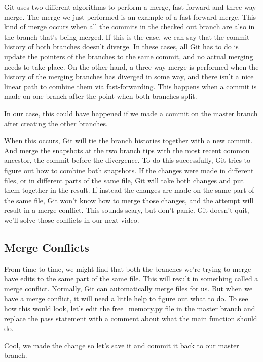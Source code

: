 	Git uses two different algorithms to perform a merge, fast-forward and three-way merge. The merge we just performed is an example of a fast-forward merge. This kind of merge occurs when all the commits in the checked out branch are also in the branch that's being merged. If this is the case, we can say that the commit history of both branches doesn't diverge. In these cases, all Git has to do is update the pointers of the branches to the same commit, and no actual merging needs to take place. On the other hand, a three-way merge is performed when the history of the merging branches has diverged in some way, and there isn't a nice linear path to combine them via fast-forwarding. This happens when a commit is made on one branch after the point when both branches split.
	
	In our case, this could have happened if we made a commit on the master branch after creating the other branches.
	
	When this occurs, Git will tie the branch histories together with a new commit. And merge the snapshots at the two branch tips with the most recent common ancestor, the commit before the divergence. To do this successfully, Git tries to figure out how to combine both snapshots. If the changes were made in different files, or in different parts of the same file, Git will take both changes and put them together in the result. If instead the changes are made on the same part of the same file, Git won't know how to merge those changes, and the attempt will result in a merge conflict. This sounds scary, but don't panic. Git doesn't quit, we'll solve those conflicts in our next video.
	
	\subsection{Merge Conflicts}

	
	From time to time, we might find that both the branches we're trying to merge have edits to the same part of the same file. This will result in something called a merge conflict. Normally, Git can automatically merge files for us. But when we have a merge conflict, it will need a little help to figure out what to do. To see how this would look, let's edit the free_memory.py file in the master branch and replace the pass statement with a comment about what the main function should do.
	
	Cool, we made the change so let's save it and commit it back to our master branch.
	
